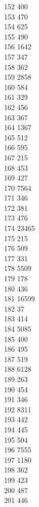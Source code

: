 { 152	400 \\
 153	470 \\
 154	625 \\
 155	490 \\
 156	1642 \\
 157	347 \\
 158	362 \\
 159	2858 \\
 160	584 \\
 161	329 \\
 162	456 \\
 163	367 \\
 164	1367 \\
 165	512 \\
 166	595 \\
 167	215 \\
 168	453 \\
 169	427 \\
 170	7564 \\
 171	346 \\
 172	381 \\
 173	476 \\
 174	23465 \\
 175	215 \\
 176	509 \\
 177	331 \\
 178	5509 \\
 179	178 \\
 180	436 \\
 181	16599 \\
 182	37 \\
 183	414 \\
 184	5085 \\
 185	400 \\
 186	495 \\
 187	519 \\
 188	6128 \\
 189	263 \\
 190	454 \\
 191	346 \\
 192	8311 \\
 193	442 \\
 194	445 \\
 195	504 \\
 196	7555 \\
 197	1180 \\
 198	362 \\
 199	423 \\
 200	487 \\
 201	446 \\
}
